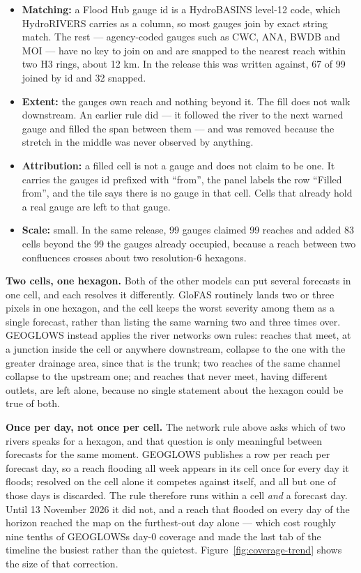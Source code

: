 \begin{itemize}
\item
  \textbf{Matching:} a Flood Hub gauge id is a HydroBASINS level-12 code, which HydroRIVERS carries as a column, so most gauges join by exact string match. The rest --- agency-coded gauges such as CWC, ANA, BWDB and MOI --- have no key to join on and are snapped to the nearest reach within two H3 rings, about 12 km. In the release this was written against, 67 of 99 joined by id and 32 snapped.
\item
  \textbf{Extent:} the gauge\textquotesingle s own reach and nothing beyond it. The fill does not walk downstream. An earlier rule did --- it followed the river to the next warned gauge and filled the span between them --- and was removed because the stretch in the middle was never observed by anything.
\item
  \textbf{Attribution:} a filled cell is not a gauge and does not claim to be one. It carries the gauge\textquotesingle s id prefixed with ``from'', the panel labels the row ``Filled from'', and the tile says there is no gauge in that cell. Cells that already hold a real gauge are left to that gauge.
\item
  \textbf{Scale:} small. In the same release, 99 gauges claimed 99 reaches and added 83 cells beyond the 99 the gauges already occupied, because a reach between two confluences crosses about two resolution-6 hexagons.
\end{itemize}

\textbf{Two cells, one hexagon.} Both of the other models can put several forecasts in one cell, and each resolves it differently. GloFAS routinely lands two or three pixels in one hexagon, and the cell keeps the worst severity among them as a single forecast, rather than listing the same warning two and three times over. GEOGLOWS instead applies the river network\textquotesingle s own rules: reaches that meet, at a junction inside the cell or anywhere downstream, collapse to the one with the greater drainage area, since that is the trunk; two reaches of the same channel collapse to the upstream one; and reaches that never meet, having different outlets, are left alone, because no single statement about the hexagon could be true of both.

\textbf{Once per day, not once per cell.} The network rule above asks which of two rivers speaks for a hexagon, and that question is only meaningful between forecasts for the same moment.
GEOGLOWS publishes a row per reach per forecast day, so a reach flooding all week appears in its cell once for every day it floods; resolved on the cell alone it competes against itself, and all but one of those days is discarded.
The rule therefore runs within a cell \emph{and} a forecast day.
Until 13 November 2026 it did not, and a reach that flooded on every day of the horizon reached the map on the furthest-out day alone --- which cost roughly nine tenths of GEOGLOWS\textquotesingle s day-0 coverage and made the last tab of the timeline the busiest rather than the quietest.
Figure~\ref{fig:coverage-trend} shows the size of that correction.

